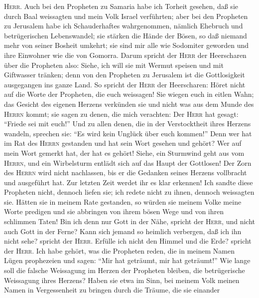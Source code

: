 \textsc{Herr}.  Auch bei den Propheten zu Samaria habe
ich Torheit gesehen, daß sie durch Baal weissagten und mein Volk Israel
verführten;  aber bei den Propheten zu Jerusalem habe ich
Schauderhaftes wahrgenommen, nämlich Ehebruch und betrügerischen
Lebenswandel; sie stärken die Hände der Bösen, so daß niemand mehr von
seiner Bosheit umkehrt; sie sind mir alle wie Sodomiter geworden und
ihre Einwohner wie die von Gomorra.  Darum spricht der
\textsc{Herr} der Heerscharen über die Propheten also: Siehe, ich will
sie mit Wermut speisen und mit Giftwasser tränken; denn von den
Propheten zu Jerusalem ist die Gottlosigkeit ausgegangen ins ganze Land.
 So spricht der \textsc{Herr} der Heerscharen: Höret
nicht auf die Worte der Propheten, die euch weissagen! Sie wiegen euch
in eitlen Wahn; das Gesicht des eigenen Herzens verkünden sie und nicht
was aus dem Munde des \textsc{Herrn} kommt;  sie sagen zu
denen, die mich verachten: Der \textsc{Herr} hat gesagt: ``Friede sei
mit euch!'' Und zu allen denen, die in der Verstocktheit ihres Herzens
wandeln, sprechen sie: ``Es wird kein Unglück über euch kommen!''
 Denn wer hat im Rat des \textsc{Herrn} gestanden und hat
sein Wort gesehen und gehört? Wer auf mein Wort gemerkt hat, der hat es
gehört!  Siehe, ein Sturmwind geht aus vom
\textsc{Herrn}, und ein Wirbelsturm entlädt sich auf das Haupt der
Gottlosen!  Der Zorn des \textsc{Herrn} wird nicht
nachlassen, bis er die Gedanken seines Herzens vollbracht und ausgeführt
hat. Zur letzten Zeit werdet ihr es klar erkennen!  Ich
sandte diese Propheten nicht, dennoch liefen sie; ich redete nicht zu
ihnen, dennoch weissagten sie.  Hätten sie in meinem Rate
gestanden, so würden sie meinem Volke meine Worte predigen und sie
abbringen von ihrem bösen Wege und von ihren schlimmen Taten!
 Bin ich denn nur Gott in der Nähe, spricht der
\textsc{Herr}, und nicht auch Gott in der Ferne?  Kann
sich jemand so heimlich verbergen, daß ich ihn nicht sehe? spricht der
\textsc{Herr}. Erfülle ich nicht den Himmel und die Erde? spricht der
\textsc{Herr}.  Ich habe gehört, was die Propheten reden,
die in meinem Namen Lügen prophezeien und sagen: ``Mir hat geträumt, mir
hat geträumt!''  Wie lange soll die falsche Weissagung im
Herzen der Propheten bleiben, die betrügerische Weissagung ihres
Herzens?  Haben sie etwa im Sinn, bei meinem Volk meinen
Namen in Vergessenheit zu bringen durch die Träume, die sie einander
